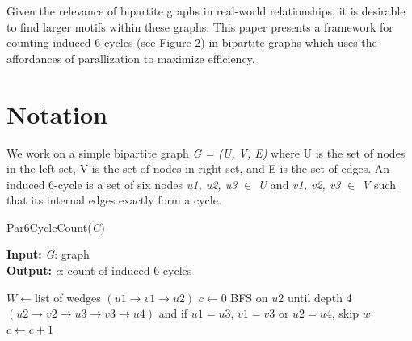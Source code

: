 \documentclass{article}
\begin{document}
Given the relevance of bipartite graphs in real-world relationships, it is desirable to find larger motifs within these graphs. This paper presents a framework for counting induced 6-cycles (see Figure 2) in bipartite graphs which uses the affordances of parallization to maximize efficiency.

\section{Notation}
We work on a simple bipartite graph 
\textit{G = (U, V, E)} where U is the set of nodes in the left set, V is the set of nodes in right set, and E is the set of edges.
An induced 6-cycle is a set of six nodes \textit{u1, u2, u3} $\in$ \textit{U} and \textit{v1, v2, v3} $\in$ \textit{V} such that its internal edges exactly form a cycle.
\\
\begin{algorithm}[H]
\caption{Par6CycleCount(\textit{G})}
\hspace*{\algorithmicindent} \textbf{Input:} \textit{G}: graph \\
\hspace*{\algorithmicindent} \textbf{Output:} \textit{c}: count of induced 6-cycles
\begin{algorithmic}[1]
    \State $W \gets $list of wedges $(u1 \rightarrow v1 \rightarrow u2)$
    \State $c \gets $0
        \State BFS on $u2$ until depth 4 $(u2 \rightarrow v2 \rightarrow u3 \rightarrow v3 \rightarrow u4)$ and if $u1 = u3$, $v1 = v3$ or $u2 = u4$, skip $w$
                \State $c \gets c + 1$
            \EndIf
        \EndFor
    \EndFor
\end{algorithmic}
\end{algorithm}
\end{document}
